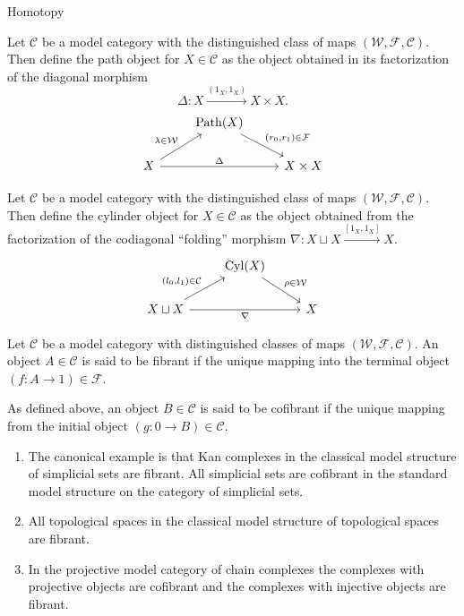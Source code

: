 \documentclass[10pt]{beamer}
\begin{document}
\begin{frame}{Homotopy}
	
	\begin{definition}
		Let $\mathcal{C}$ be a model category with the distinguished class of maps $(\mathcal{W,F,C})$. Then define the path object for $X \in \mathcal{C}$ as the object obtained in its factorization of the diagonal morphism $$\Delta: X \xrightarrow{(1_X,1_X)} X \times X.$$
		\[\begin{tikzcd}
			& {\mathrm{Path}(X)} \\
			X && {X\times X}
			\arrow["{(r_0,r_1) \in \mathcal{F}}", from=1-2, to=2-3]
			\arrow["{\lambda \in \mathcal{W}}", from=2-1, to=1-2]
			\arrow["{\Delta}", from=2-1, to=2-3]
		\end{tikzcd}\]
	\end{definition}
	\pagebreak
	\begin{definition}
		Let $\mathcal{C}$ be a model category with the distinguished class of maps $(\mathcal{W,F,C})$. Then define the cylinder object for $X \in \mathcal{C}$ as the object obtained from the factorization of the codiagonal ``folding'' morphism $\nabla: X \sqcup X \xrightarrow{[1_X,1_X]} X$.
		\[\begin{tikzcd}
			& {\mathrm{Cyl}(X)} \\
			{X\sqcup X} && X
			\arrow["{\rho\in \mathcal{W}}", from=1-2, to=2-3]
			\arrow["{(l_0,l_1)\in\mathcal{C}}", from=2-1, to=1-2]
			\arrow["\nabla"', from=2-1, to=2-3]
		\end{tikzcd}\]
	\end{definition}
	\pagebreak
	\begin{definition}
		Let $\mathcal{C}$ be a model category with distinguished classes of maps $(\mathcal{W,F,C})$. An object $A \in \mathcal{C}$ is said to be fibrant if the unique mapping into the terminal object $(f: A \to 1) \in \mathcal{F}$.
	\end{definition}

	\begin{definition}
		As defined above, an object $B \in \mathcal{C}$ is said to be cofibrant if the unique mapping from the initial object $(g:0 \to B) \in \mathcal{C}$.
	\end{definition}
	
	
		\begin{example}
		\begin{enumerate}
			\item The canonical example is that Kan complexes in the classical model structure of simplicial sets are fibrant. All simplicial sets are cofibrant in the standard model structure on the category of simplicial sets.
			\item All topological spaces in the classical model structure of topological spaces are fibrant.
			\item In the projective model category of chain complexes the complexes with projective objects are cofibrant and the complexes with injective objects are fibrant.
		\end{enumerate}
		

\end{example}
\end{frame}
\end{document}
